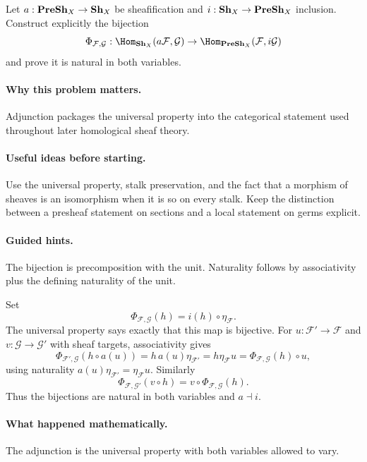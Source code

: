 \begin{problem}
Let $a:\mathbf{PreSh}_X\to\mathbf{Sh}_X$ be sheafification and $i:\mathbf{Sh}_X\to\mathbf{PreSh}_X$ inclusion. Construct explicitly the bijection
\[
\Phi_{\mathcal F,\mathcal G}:\Hom_{\Sh_X}(a\mathcal F,\mathcal G)\to\Hom_{\PreSh_X}(\mathcal F,i\mathcal G)
\]
and prove it is natural in both variables.
\end{problem}

\paragraph{Why this problem matters.}
Adjunction packages the universal property into the categorical statement used throughout later homological sheaf theory.

\paragraph{Useful ideas before starting.}
Use the universal property, stalk preservation, and the fact that a morphism of sheaves is an isomorphism when it is so on every stalk.  Keep the distinction between a presheaf statement on sections and a local statement on germs explicit.

\paragraph{Guided hints.}
The bijection is precomposition with the unit. Naturality follows by associativity plus the defining naturality of the unit.

\ifdefined\FullProblemDossiers
\begin{solution}
Set
\[
\Phi_{\mathcal F,\mathcal G}(h)=i(h)\circ\eta_{\mathcal F}.
\]
The universal property says exactly that this map is bijective. For $u:\mathcal F'\to\mathcal F$ and $v:\mathcal G\to\mathcal G'$ with sheaf targets, associativity gives
\[
\Phi_{\mathcal F',\mathcal G}(h\circ a(u))
=h\,a(u)\eta_{\mathcal F'}=h\eta_{\mathcal F}u
=\Phi_{\mathcal F,\mathcal G}(h)\circ u,
\]
using naturality $a(u)\eta_{\mathcal F'}=\eta_{\mathcal F}u$. Similarly
\[
\Phi_{\mathcal F,\mathcal G'}(v\circ h)=v\circ\Phi_{\mathcal F,\mathcal G}(h).
\]
Thus the bijections are natural in both variables and $a\dashv i$.
\end{solution}

\paragraph{What happened mathematically.}
The adjunction is the universal property with both variables allowed to vary.

